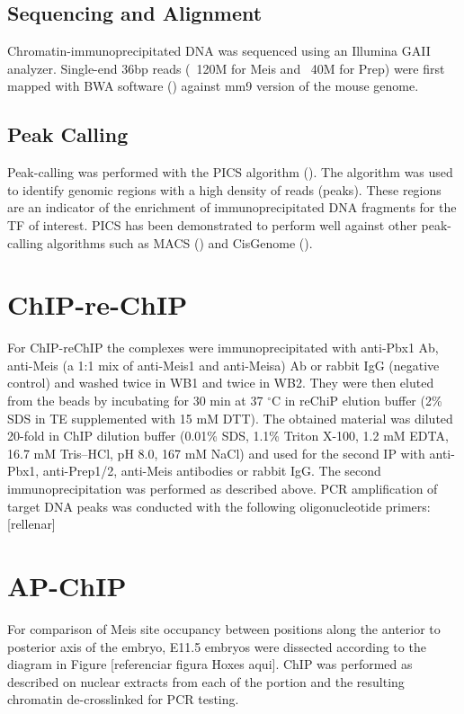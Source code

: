 \subsection{Sequencing and Alignment}

Chromatin-immunoprecipitated DNA was sequenced using an Illumina GAII analyzer. Single-end 36bp reads (~120M for Meis and ~40M for Prep) were first mapped with BWA software (\cite{Li2009}) against mm9 version of the mouse genome.

\subsection{Peak Calling}

Peak-calling was performed with the \ac{PICS} algorithm (\cite{Zhang2011}). The algorithm was used to identify genomic regions with a high density of reads (peaks). These regions are an indicator of the enrichment of immunoprecipitated DNA fragments for the \ac{TF} of interest. \ac{PICS} has been demonstrated to perform well against other peak-calling algorithms such as \ac{MACS} (\cite{Zhang2008}) and CisGenome (\cite{Ji2011}).

\section{ChIP-re-ChIP}

For ChIP-reChIP the complexes were immunoprecipitated with anti-Pbx1 Ab, anti-Meis (a 1:1 mix of anti-Meis1 and anti-Meisa) Ab or rabbit IgG (negative control) and washed twice in WB1 and twice in WB2. They were then eluted from the beads by incubating for 30 min at 37 $^\circ$C in reChiP elution buffer (2\% SDS in TE supplemented with 15 mM DTT). The obtained material was diluted 20-fold in ChIP dilution buffer (0.01\% SDS, 1.1\% Triton X-100, 1.2 mM EDTA, 16.7 mM Tris–HCl, pH 8.0, 167 mM NaCl) and used for the second IP with anti-Pbx1, anti-Prep1/2, anti-Meis antibodies or rabbit IgG. The second immunoprecipitation was performed as described above. \ac{PCR} amplification of target DNA peaks was conducted with the following oligonucleotide primers: [rellenar]

\section{AP-ChIP}

For comparison of Meis site occupancy between positions along the anterior to posterior axis of the embryo, E11.5 embryos were dissected according to the diagram in  Figure [referenciar figura Hoxes aqui]. ChIP was performed as described on nuclear extracts from each of the portion and the resulting chromatin de-crosslinked for \ac{PCR} testing.

